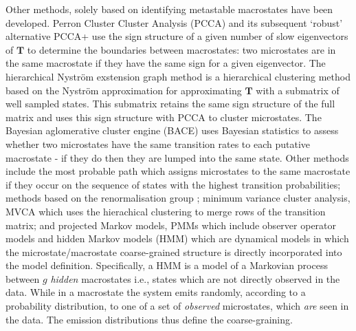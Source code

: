 Other methods, solely based on identifying metastable macrostates have been developed. Perron Cluster Cluster Analysis (PCCA) \cite{deuflhardIdentificationAlmostInvariant2000a} and its subsequent `robust' alternative PCCA+ \cite{deuflhardRobustPerronCluster2005b} use the sign structure of a given number of slow eigenvectors of $\mathbf{T}$ to determine the boundaries between macrostates: two microstates are in the same macrostate if they have the same sign for a given eigenvector.  The hierarchical Nystr{\"o}m exstension graph method is a hierarchical clustering method based on the Nystr{\"o}m approximation for approximating $\mathbf{T}$ \cite{yaoHierarchicalNystromMethods2013a} with a submatrix of well sampled states. This submatrix retains the same sign structure of the full matrix and uses this sign structure with PCCA to cluster microstates. The Bayesian aglomerative cluster engine (BACE) \cite{bowmanImprovedCoarsegrainingMarkov2012a} uses Bayesian statistics to assess whether two microstates have the same transition rates to each putative macrostate - if they do then they are lumped into the same state. Other methods include the most probable path \cite{jainIdentifyingMetastableStates2012a} which assigns microstates to the same macrostate if they occur on the sequence of states with the highest transition probabilities; methods based on the renormalisation group \cite{orioliDimensionalReductionMarkov2016c};  minimum variance cluster analysis, MVCA \cite{husicMinimumVarianceClustering2018} which uses the hierachical clustering to merge rows of the transition matrix; and projected Markov models, PMMs \cite{noeProjectedHiddenMarkov2013a} which include observer operator models \cite{wuProjectedMetastableMarkov2015} and hidden Markov models \cite{noeProjectedHiddenMarkov2013a} (HMM) which are dynamical models in which the microstate/macrostate coarse-grained structure is directly incorporated into the model definition. Specifically, a HMM is a model of a Markovian process between $g$ \emph{hidden} macrostates i.e., states which are not directly observed in the data. While in a macrostate the system emits randomly, according to a probability distribution, to one of a set of \emph{observed} microstates, which \emph{are} seen in the data. The emission distributions thus define the coarse-graining. 

